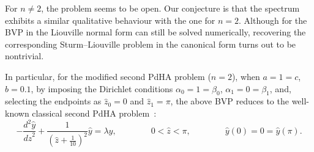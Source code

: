 \documentclass[symmetry,article,accept,moreauthors,pdftex,a4paper]{mdpi}
\begin{document}
\begin{paracol}{2}
\switchcolumn

For $n \neq 2$, the problem seems to be open. Our conjecture is that the spectrum exhibits a similar qualitative behaviour with the one for $n = 2$. Although for the BVP in the Liouville normal form can still be solved numerically, recovering the corresponding Sturm--Liouville problem in the canonical form turns out to be nontrivial.
\begin{Corollary}
In particular, for the modified second PdHA problem ($n = 2$), when $a = 1 = c$, $b = 0.1$, by imposing the Dirichlet conditions $\alpha_0 = 1 = \beta_0$, $\alpha_1 = 0 = \beta_1$, and, selecting the endpoints as $\widehat{z}_0 = 0$ and $\widehat{z}_1 = \pi$, the above BVP reduces to the well-known classical second PdHA problem~{\rm\cite{paine1981correction}}:
\begin{equation*}
-\frac{d^2\widehat{y}}{d\widehat{z}^2} + \frac{1}{\left(\widehat{z} + \frac{1}{10} \right)^2} \widehat{y} = \lambda \widehat{y}, \qquad \qquad 0 < \widehat{z} < \pi, \qquad \qquad \widehat{y}(0) = 0 = \widehat{y}(\pi).
\end{equation*}	
\end{Corollary}


\end{paracol}
\end{document}
